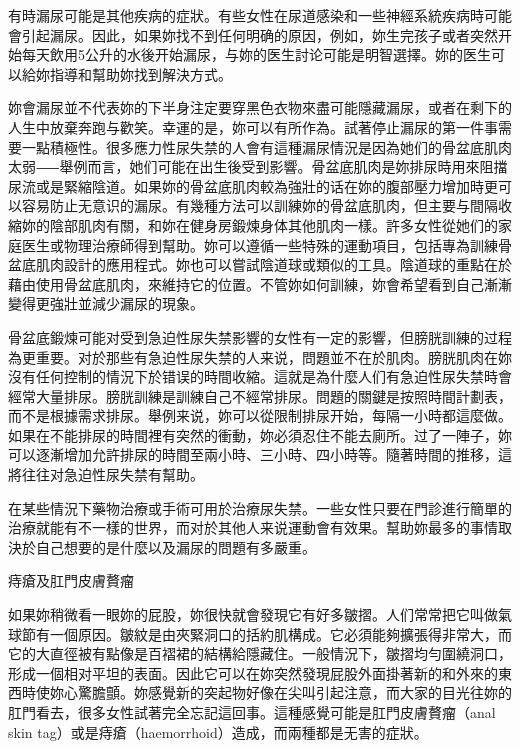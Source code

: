 \documentclass[12pt,UTF8]{ctexbook}
\begin{document}
有時漏尿可能是其他疾病的症狀。有些女性在尿道感染和一些神經系統疾病時可能會引起漏尿。因此，如果妳找不到任何明确的原因，例如，妳生完孩子或者突然开始每天飲用5公升的水後开始漏尿，与妳的医生討论可能是明智選擇。妳的医生可以給妳指導和幫助妳找到解決方式。

妳會漏尿並不代表妳的下半身注定要穿黑色衣物來盡可能隱藏漏尿，或者在剩下的人生中放棄奔跑与歡笑。幸運的是，妳可以有所作為。試著停止漏尿的第一件事需要一點積極性。很多應力性尿失禁的人會有這種漏尿情況是因為她们的骨盆底肌肉太弱⸺舉例而言，她们可能在出生後受到影響。骨盆底肌肉是妳排尿時用來阻擋尿流或是緊縮陰道。如果妳的骨盆底肌肉較為強壯的话在妳的腹部壓力增加時更可以容易防止无意识的漏尿。有幾種方法可以訓練妳的骨盆底肌肉，但主要与間隔收縮妳的陰部肌肉有關，和妳在健身房鍛煉身体其他肌肉一樣。許多女性從她们的家庭医生或物理治療師得到幫助。妳可以遵循一些特殊的運動項目，包括專為訓練骨盆底肌肉設計的應用程式。妳也可以嘗試陰道球或類似的工具。陰道球的重點在於藉由使用骨盆底肌肉，來維持它的位置。不管妳如何訓練，妳會希望看到自己漸漸變得更強壯並減少漏尿的現象。

骨盆底鍛煉可能对受到急迫性尿失禁影響的女性有一定的影響，但膀胱訓練的过程為更重要。对於那些有急迫性尿失禁的人来说，問題並不在於肌肉。膀胱肌肉在妳沒有任何控制的情況下於错误的時間收縮。這就是為什麼人们有急迫性尿失禁時會經常大量排尿。膀胱訓練是訓練自己不經常排尿。問題的關鍵是按照時間計劃表，而不是根據需求排尿。舉例来说，妳可以從限制排尿开始，每隔一小時都這麼做。如果在不能排尿的時間裡有突然的衝動，妳必須忍住不能去廁所。过了一陣子，妳可以逐漸增加允許排尿的時間至兩小時、三小時、四小時等。隨著時間的推移，這將往往对急迫性尿失禁有幫助。

在某些情況下藥物治療或手術可用於治療尿失禁。一些女性只要在門診進行簡單的治療就能有不一樣的世界，而对於其他人来说運動會有效果。幫助妳最多的事情取決於自己想要的是什麼以及漏尿的問題有多嚴重。





痔瘡及肛門皮膚贅瘤




如果妳稍微看一眼妳的屁股，妳很快就會發現它有好多皺摺。人们常常把它叫做氣球節有一個原因。皺紋是由夾緊洞口的括約肌構成。它必須能夠擴張得非常大，而它的大直徑被有點像是百褶裙的結構給隱藏住。一般情況下，皺摺均勻圍繞洞口，形成一個相对平坦的表面。因此它可以在妳突然發現屁股外面掛著新的和外來的東西時使妳心驚膽顫。妳感覺新的突起物好像在尖叫引起注意，而大家的目光往妳的肛門看去，很多女性試著完全忘記這回事。這種感覺可能是肛門皮膚贅瘤（anal skin tag）或是痔瘡（haemorrhoid）造成，而兩種都是无害的症狀。
\end{document}
